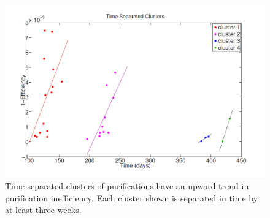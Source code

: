 \begin{figure}[H]
\centering
\includegraphics[scale=0.2]{Figfour.png}
\caption{Time-separated clusters of purifications have an upward trend in purification inefficiency.  Each cluster shown is separated in time by at least three weeks.}
\label{fig:Clusters}
\end{figure}

